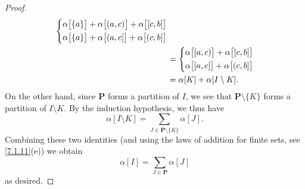 \begin{proof}
\begin{align*}
\begin{dcases}
                                 \alpha\big[\{a\}\big] + \alpha\big[(a, c)\big] + \alpha\big[[c, b]\big] \\
                                 \alpha\big[\{a\}\big] + \alpha\big[(a, c]\big] + \alpha\big[(c, b]\big]
                               \end{dcases} \\
                           & = \begin{dcases}
                                 \alpha\big[[a, c)\big] + \alpha\big[[c, b]\big] \\
                                   \alpha\big[[a, c]\big] + \alpha\big[(c, b]\big]
                               \end{dcases}                        \\
                           & = \alpha[K] + \alpha[I \setminus K].
  \end{align*}
  On the other hand, since \(\mathbf{P}\) forms a partition of \(I\), we see that \(\mathbf{P} \setminus \{K\}\) forms a partition of \(I \setminus K\).
  By the induction hypothesis, we thus have
  \[
    \alpha[I \setminus K] = \sum_{J \in \mathbf{P} \setminus \{K\}} \alpha[J].
  \]
  Combining these two identities (and using the laws of addition for finite sets, see \cref{7.1.11}(e)) we obtain
  \[
    \alpha[I] = \sum_{J \in \mathbf{P}} \alpha[J]
  \]
  as desired.


\end{proof}
